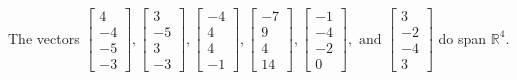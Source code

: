 \begin{exercise}
\begin{exerciseStatement}
  \end{exerciseStatement}
  \begin{exerciseAnswer}
   The vectors \(\left[\begin{array}{r}
4 \\
-4 \\
-5 \\
-3
\end{array}\right] , \left[\begin{array}{r}
3 \\
-5 \\
3 \\
-3
\end{array}\right] , \left[\begin{array}{r}
-4 \\
4 \\
4 \\
-1
\end{array}\right] , \left[\begin{array}{r}
-7 \\
9 \\
4 \\
14
\end{array}\right] , \left[\begin{array}{r}
-1 \\
-4 \\
-2 \\
0
\end{array}\right] , \text{ and } \left[\begin{array}{r}
3 \\
-2 \\
-4 \\
3
\end{array}\right]\) 
  	 do  
	span \(\mathbb{R}^4\).
  


  \end{exerciseAnswer}
\end{exercise}